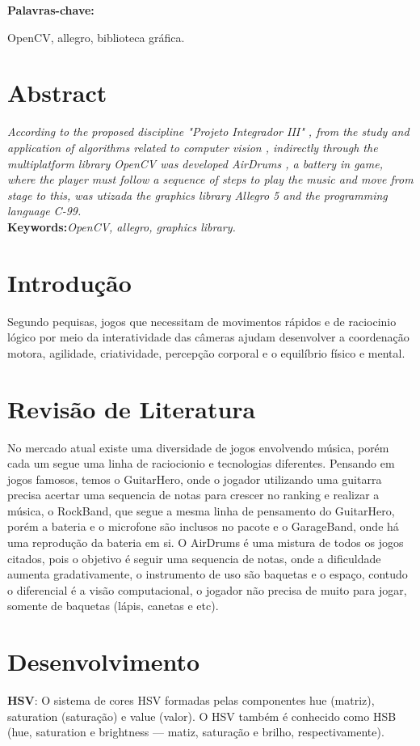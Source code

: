 \documentclass[12pt,openright,oneside,a4paper,brazil]{abntex2}
\begin{document}
\textbf{Palavras-chave:} {OpenCV, allegro, biblioteca gráfica.

\section*{Abstract}

\textit{According to the proposed discipline "Projeto Integrador III" , from the study and application of algorithms related to computer vision , indirectly through the multiplatform library OpenCV was developed AirDrums , a battery in game, where the player must follow a sequence of steps to play the music and move from stage to this, was utizada the graphics library Allegro 5 and the programming language C-99.} \\

\textbf{Keywords:}\textit{OpenCV, allegro, graphics library.} 

\section*{Introdução}

Segundo pequisas, jogos que necessitam de movimentos rápidos e de raciocinio lógico por meio da interatividade das câmeras ajudam desenvolver a coordenação motora, agilidade, criatividade, percepção corporal e o equilíbrio físico e mental.

\section*{Revisão de Literatura}

No mercado atual existe uma diversidade de jogos envolvendo música, porém cada um segue uma linha de raciocionio e tecnologias diferentes. Pensando em jogos famosos, temos o GuitarHero, onde o jogador utilizando uma guitarra precisa acertar uma sequencia de notas para crescer no ranking e realizar a música, o RockBand, que segue a mesma linha de pensamento do GuitarHero, porém a bateria e o microfone são inclusos no pacote e o GarageBand, onde há uma reprodução da bateria em si. O AirDrums é uma mistura de todos os jogos citados, pois o objetivo é seguir uma sequencia de notas, onde a dificuldade aumenta gradativamente, o instrumento de uso são baquetas e o espaço, contudo o diferencial é a visão computacional, o jogador não precisa de muito para jogar, somente de baquetas (lápis, canetas e etc).

\section*{Desenvolvimento}
\textbf{HSV}:
O sistema de cores HSV formadas pelas componentes hue (matriz), saturation (saturação) e value (valor). O HSV também é conhecido como HSB (hue, saturation e brightness — matiz, saturação e brilho, respectivamente). 

}
\end{document}
